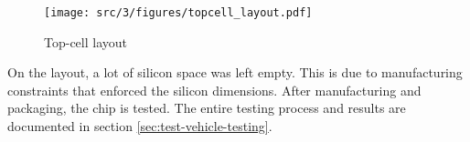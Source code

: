 \begin{figure}[!h]
  \centering
  \texttt{[image: src/3/figures/topcell\_layout.pdf]}
  \caption{Top-cell layout}
  \label{fig:top-cell-layout}
\end{figure}

On the layout, a lot of silicon space was left empty.
This is due to manufacturing constraints that enforced the silicon dimensions.
After manufacturing and packaging, the chip is tested.
The entire testing process and results are documented in section \ref{sec:test-vehicle-testing}.

